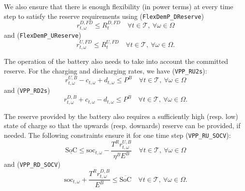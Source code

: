\documentclass{article}
\newcommand{\SOC}{\text{SoC}}
\newcommand{\soc}{\text{soc}}
\begin{document}
We also ensure that there is enough flexibility (in power terms) at every time step to satisfy the reserve requirements using (\verb|FlexDemP_DReserve|)
\begin{equation} \label{EQ:FlexDemP_DReserve}
	r^{D, FD}_{t, \omega} \leq R^{D, FD}_t \quad \forall t \in \mathcal{T}, \ \forall \omega \in \Omega
\end{equation}
and (\verb|FlexDemP_UReserve|)
\begin{equation} \label{EQ:FlexDemP_UReserve}
	r^{U, FD}_{t, \omega} \leq R^{U, FD}_t \quad \forall t \in \mathcal{T}, \ \forall \omega \in \Omega.
\end{equation}

The operation of the battery also needs to take into account the committed reserve. For the charging and discharging rates, we have (\verb|VPP_RU2s|):
\begin{equation} \label{EQ:VPP_RU2s}
	r^{U, B} _{t, \omega} - c_{t, \omega} + d_{t, \omega}  \leq P^B \quad \forall t \in \mathcal{T}, \ \forall \omega \in \Omega
\end{equation}
and (\verb|VPP_RD2s|)
\begin{equation} \label{EQ:VPP_RD2s}
	r^{D, B}_{t, \omega} + c_{t, \omega} - d_{t, \omega} \leq P^B \quad \forall t \in \mathcal{T}, \ \forall \omega \in \Omega.
\end{equation}

The reserve provided by the battery also requires a sufficiently high (resp. low) state of charge so that the upwards (resp. downards) reserve can be provided, if needed. The following constraints ensure it for one time step (\verb|VPP_RU_SOCV|):
\begin{equation} \label{EQ:VPP_RU_SOCV}
	\underline{\SOC} \leq \soc_{t, \omega} - \frac{T^R r^{U, B}_{t, \omega}}{\eta^B E^B} \quad \forall t \in \mathcal{T}, \ \forall \omega \in \Omega
\end{equation}
and  (\verb|VPP_RD_SOCV|)
\begin{equation} \label{EQ:VPP_RD_SOCV}
	\soc_{t, \omega} + \frac{T^R r^{D, B}_{t, \omega} }{E^B} \leq \overline{\SOC} \quad \forall t \in \mathcal{T}, \ \forall \omega \in \Omega.
\end{equation}
\end{document}
